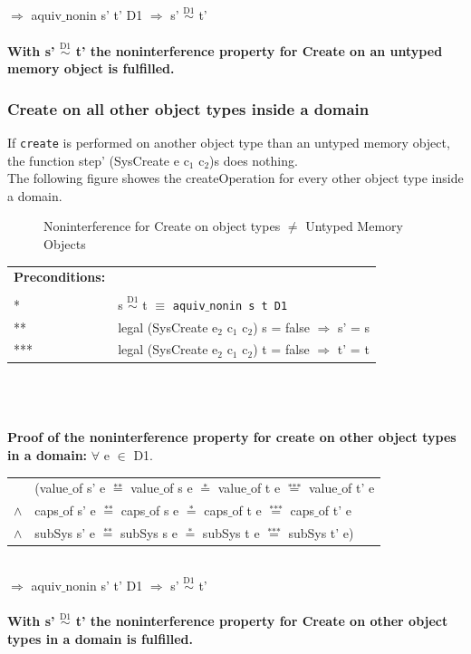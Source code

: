 \documentclass[pdftex,11pt,a4paper,twoside]{article}
\begin{document}
$\Rightarrow$ aquiv$\_$nonin s' t' D1 $\Rightarrow$ s' $\overset{\text{D1}}{\sim}$ t' \\ \\
\textbf{With s' $\overset{\text{D1}}{\sim}$ t' the noninterference property for Create on an untyped memory object is fulfilled.} 
\subsubsection{Create on all other object types inside a domain}
If \texttt{create} is performed on another object type than an untyped memory object, the  function step' (SysCreate e c$_1$ c$_2$)s does nothing. \\
The following figure showes the createOperation for every other object type inside a domain.
\begin{flushleft}
\begin{figure}[H]
\caption{Noninterference for Create on object types $\neq$ Untyped Memory Objects}
\end{figure}
\end{flushleft}
\begin{tabular}{ll}
\textbf{Preconditions:} \\ \\
* & s $\overset{\text{D1}}{\sim}$ t $\equiv$ \texttt{aquiv$\_$nonin s t D1}	\\ 
** & legal (SysCreate e$_2$ c$_1$ c$_2$) s = false $\Rightarrow$ s' = s \\ 
*** & legal (SysCreate e$_2$ c$_1$ c$_2$) t = false $\Rightarrow$ t' = t
\end{tabular}\\ \\ \\
\textbf{Proof of the noninterference property for create on other object types in a domain:}
$\forall$ e $\in$ D1. \\ 
\begin{tabular}{ll}
& (value$\_$of s' e $\overset{\text{**}}{=}$ value$\_$of s e $\overset{\text{*}}{=}$ value$\_$of t e $\overset{\text{***}}{=}$ value$\_$of t' e \\
$\wedge$ & caps$\_$of s' e $\overset{\text{**}}{=}$ caps$\_$of s e $\overset{\text{*}}{=}$ caps$\_$of t e $\overset{\text{***}}{=}$ caps$\_$of t' e \\
$\wedge$ & subSys s' e $\overset{\text{**}}{=}$ subSys s e $\overset{\text{*}}{=}$ subSys t e $\overset{\text{***}}{=}$ subSys t' e)
\end{tabular} \\
$\Rightarrow$ aquiv$\_$nonin s' t' D1 $\Rightarrow$ s' $\overset{\text{D1}}{\sim}$ t' \\ \\
\textbf{With s' $\overset{\text{D1}}{\sim}$ t' the noninterference property for Create on other object types in a domain is fulfilled.} 
\end{document}
